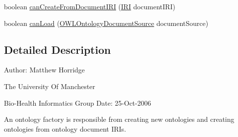\begin{DoxyCompactItemize}
\item 
boolean \hyperlink{interfaceorg_1_1semanticweb_1_1owlapi_1_1model_1_1_o_w_l_ontology_factory_a1db016a0225bca3b437fa8b5594cd461}{can\-Create\-From\-Document\-I\-R\-I} (\hyperlink{classorg_1_1semanticweb_1_1owlapi_1_1model_1_1_i_r_i}{I\-R\-I} document\-I\-R\-I)
\item 
boolean \hyperlink{interfaceorg_1_1semanticweb_1_1owlapi_1_1model_1_1_o_w_l_ontology_factory_a5a351af64094c8610e12f986823a0b63}{can\-Load} (\hyperlink{interfaceorg_1_1semanticweb_1_1owlapi_1_1io_1_1_o_w_l_ontology_document_source}{O\-W\-L\-Ontology\-Document\-Source} document\-Source)
\end{DoxyCompactItemize}


\subsection{Detailed Description}
Author\-: Matthew Horridge\par
 The University Of Manchester\par
 Bio-\/\-Health Informatics Group Date\-: 25-\/\-Oct-\/2006 

An ontology factory is responsible from creating new ontologies and creating ontologies from ontology document I\-R\-Is. 

